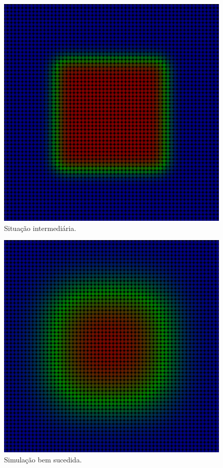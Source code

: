 \documentclass[xcolor=dvipsnames,10pt,aspectratio=169]{beamer}
\begin{document}
\begin{frame}
\begin{minipage}[h!]{0.30\textwidth}
\begin{figure}[h!]
				\includegraphics[trim = {1cm 1cm 1cm 1cm}, clip , angle=0, scale=0.3]{images/sucesso_2}
				\caption{Situação intermediária.}
			\end{figure}
		\end{minipage}
		\begin{minipage}[h!]{0.30\textwidth}
			\begin{figure}[h!]
				\centering
				\includegraphics[trim = {1cm 1cm 1cm 1cm}, clip , angle=0, scale=0.3]{images/sucesso_3}
				\caption{Simulação bem sucedida.}
			\end{figure}
		\end{minipage}
	\end{frame}
\end{document}

